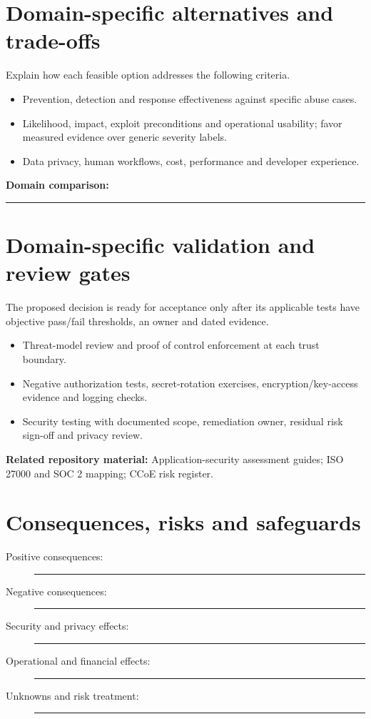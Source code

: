 \documentclass[11pt,letterpaper]{article}
\newcommand{\BlankResponse}{\rule[-0.4em]{0pt}{2em}\rule{0.65\linewidth}{0.4pt}}
\begin{document}
\section{Domain-specific alternatives and trade-offs}
Explain how each feasible option addresses the following criteria.
\begin{itemize}
\item Prevention, detection and response effectiveness against specific abuse cases.
\item Likelihood, impact, exploit preconditions and operational usability; favor measured evidence over generic severity labels.
\item Data privacy, human workflows, cost, performance and developer experience.
\end{itemize}
\noindent\textbf{Domain comparison:} \BlankResponse
\section{Domain-specific validation and review gates}
The proposed decision is ready for acceptance only after its applicable
tests have objective pass/fail thresholds, an owner and dated evidence.
\begin{itemize}
\item Threat-model review and proof of control enforcement at each trust boundary.
\item Negative authorization tests, secret-rotation exercises, encryption/key-access evidence and logging checks.
\item Security testing with documented scope, remediation owner, residual risk sign-off and privacy review.
\end{itemize}
\noindent\textbf{Related repository material:} Application-security assessment guides; ISO 27000 and SOC 2 mapping; CCoE risk register.

\section{Consequences, risks and safeguards}
\begin{description}
\item[Positive consequences:] \BlankResponse
\item[Negative consequences:] \BlankResponse
\item[Security and privacy effects:] \BlankResponse
\item[Operational and financial effects:] \BlankResponse
\item[Unknowns and risk treatment:] \BlankResponse
\end{description}
\end{document}
